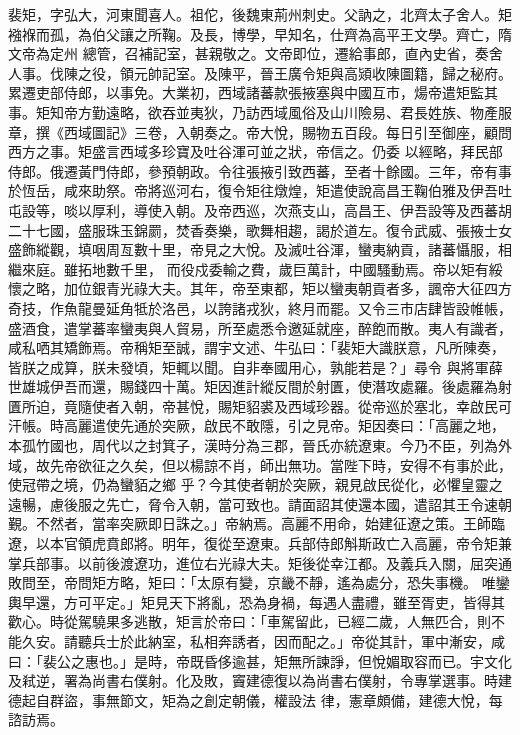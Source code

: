 \begin{pinyinscope}
 裴矩，字弘大，河東聞喜人。祖佗，後魏東荊州刺史。父訥之，北齊太子舍人。矩襁褓而孤，為伯父讓之所鞠。及長，博學，早知名，仕齊為高平王文學。齊亡，隋文帝為定州
 總管，召補記室，甚親敬之。文帝即位，遷給事郎，直內史省，奏舍人事。伐陳之役，領元帥記室。及陳平，晉王廣令矩與高熲收陳圖籍，歸之秘府。累遷吏部侍郎，以事免。大業初，西域諸蕃款張掖塞與中國互市，煬帝遣矩監其事。矩知帝方勤遠略，欲吞並夷狄，乃訪西域風俗及山川險易、君長姓族、物產服章，撰《西域圖記》三卷，入朝奏之。帝大悅，賜物五百段。每日引至御座，顧問西方之事。矩盛言西域多珍寶及吐谷渾可並之狀，帝信之。仍委
 以經略，拜民部侍郎。俄遷黃門侍郎，參預朝政。令往張掖引致西蕃，至者十餘國。三年，帝有事於恆岳，咸來助祭。帝將巡河右，復令矩往燉煌，矩遣使說高昌王鞠伯雅及伊吾吐屯設等，啖以厚利，導使入朝。及帝西巡，次燕支山，高昌王、伊吾設等及西蕃胡二十七國，盛服珠玉錦罽，焚香奏樂，歌舞相趨，謁於道左。復令武威、張掖士女盛飾縱觀，填咽周亙數十里，帝見之大悅。及滅吐谷渾，蠻夷納貢，諸蕃懾服，相繼來庭。雖拓地數千里，
 而役戍委輸之費，歲巨萬計，中國騷動焉。帝以矩有綏懷之略，加位銀青光祿大夫。其年，帝至東都，矩以蠻夷朝貢者多，諷帝大征四方奇技，作魚龍曼延角牴於洛邑，以誇諸戎狄，終月而罷。又令三市店肆皆設帷帳，盛酒食，遣掌蕃率蠻夷與人貿易，所至處悉令邀延就座，醉飽而散。夷人有識者，咸私哂其矯飾焉。帝稱矩至誠，謂宇文述、牛弘曰：「裴矩大識朕意，凡所陳奏，皆朕之成算，朕未發頃，矩輒以聞。自非奉國用心，孰能若是？」尋令
 與將軍薛世雄城伊吾而還，賜錢四十萬。矩因進計縱反間於射匱，使潛攻處羅。後處羅為射匱所迫，竟隨使者入朝，帝甚悅，賜矩貂裘及西域珍器。從帝巡於塞北，幸啟民可汗帳。時高麗遣使先通於突厥，啟民不敢隱，引之見帝。矩因奏曰：「高麗之地，本孤竹國也，周代以之封箕子，漢時分為三郡，晉氏亦統遼東。今乃不臣，列為外域，故先帝欲征之久矣，但以楊諒不肖，師出無功。當陛下時，安得不有事於此，使冠帶之境，仍為蠻貊之鄉
 乎？今其使者朝於突厥，親見啟民從化，必懼皇靈之遠暢，慮後服之先亡，脅令入朝，當可致也。請面詔其使還本國，遣詔其王令速朝覲。不然者，當率突厥即日誅之。」帝納焉。高麗不用命，始建征遼之策。王師臨遼，以本官領虎賁郎將。明年，復從至遼東。兵部侍郎斛斯政亡入高麗，帝令矩兼掌兵部事。以前後渡遼功，進位右光祿大夫。矩後從幸江都。及義兵入關，屈突通敗問至，帝問矩方略，矩曰：「太原有變，京畿不靜，遙為處分，恐失事機。
 唯鑾輿早還，方可平定。」矩見天下將亂，恐為身禍，每遇人盡禮，雖至胥吏，皆得其歡心。時從駕驍果多逃散，矩言於帝曰：「車駕留此，已經二歲，人無匹合，則不能久安。請聽兵士於此納室，私相奔誘者，因而配之。」帝從其計，軍中漸安，咸曰：「裴公之惠也。」是時，帝既昏侈逾甚，矩無所諫諍，但悅媚取容而已。宇文化及弒逆，署為尚書右僕射。化及敗，竇建德復以為尚書右僕射，令專掌選事。時建德起自群盜，事無節文，矩為之創定朝儀，權設法
 律，憲章頗備，建德大悅，每諮訪焉。




\end{pinyinscope}
